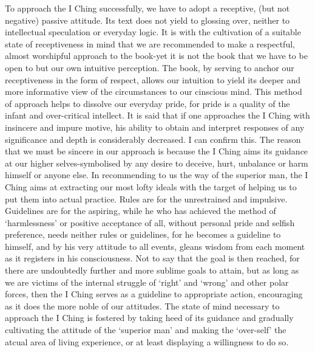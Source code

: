 \documentclass[11pt]{book}
\begin{document}
To approach the I Ching successfully, we have to adopt a receptive, (but not negative) passive attitude. Its text does not yield to glossing over, neither to intellectual speculation or everyday logic. It is with the cultivation of a suitable state of receptiveness in mind that we are recommended to make a respectful, almost worshipful approach to the book-yet it is not the book that we have to be open to but our own intuitive perception. The book, by serving to anchor our receptiveness in the form of respect, allows our intuition to yield its deeper and more informative view of the circumstances to our cinscious mind. This method of approach helps to dissolve our everyday pride, for pride is a quality of the infant and over-critical intellect. It is said that if one approaches the I Ching with insincere and impure motive, his ability to obtain and interpret responses of any significance and depth is considerably decreased. I can confirm this. The reason that we must be sincere in our approach is because the I Ching aims its guidance at our higher selves-symbolised by any desire to deceive, hurt, unbalance or harm himself or anyone else. In recommending to us the way of the superior man, the I Ching aims at extracting our most lofty ideals with the target of helping us to put them into actual practice. Rules are for the unrestrained and impulsive. Guidelines are for the aspiring, while he who has achieved the method of `harmlessness' or positive acceptance of all, without personal pride and selfish preference, needs neither rules or guidelines, for he becomes a guideline to himself, and by his very attitude to all events, gleans wisdom from each moment as it registers in his consciousness. Not to say that the goal is then reached, for there are undoubtedly further and more sublime goals to attain, but as long as we are victims of the internal struggle of `right' and `wrong' and other polar forces, then the I Ching serves as a guideline to appropriate action, encouraging as it does the more noble of our attitudes. The state of mind necessary to approach the I Ching is fostered by taking heed of its guidance and gradually cultivating the attitude of the `superior man' and making the `over-self' the atcual area of living experience, or at least displaying a willingness to do so.
\end{document}
